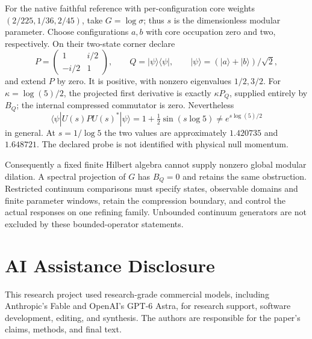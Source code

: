 \documentclass[11pt]{article}
\begin{document}
For the native faithful reference with per-configuration core weights
$(2/225,1/36,2/45)$, take $G=\log\sigma$; thus $s$ is the dimensionless
modular parameter. Choose configurations $a,b$ with core occupation zero
and two, respectively. On their two-state corner declare
\[
 P=\begin{pmatrix}1&i/2\\-i/2&1\end{pmatrix},\qquad
 Q=|\psi\rangle\langle\psi|,\qquad
 |\psi\rangle=(|a\rangle+|b\rangle)/\sqrt2,
\]
and extend $P$ by zero. It is positive, with nonzero eigenvalues
$1/2,3/2$. For $\kappa=\log(5)/2$, the projected first derivative
is exactly $\kappa P_Q$, supplied entirely by $B_Q$; the internal
compressed commutator is zero. Nevertheless
\[
 \langle\psi|U(s)PU(s)^*|\psi\rangle
 =1+\tfrac12\sin(s\log5)\ne e^{s\log(5)/2}
\]
in general. At $s=1/\log5$ the two values are approximately $1.420735$
and $1.648721$. The declared probe is not identified with physical null
momentum.

Consequently a fixed finite Hilbert algebra cannot supply nonzero
global modular dilation. A spectral projection of $G$ has $B_Q=0$ and
retains the same obstruction. Restricted continuum comparisons must
specify states, observable domains and finite parameter windows, retain
the compression boundary, and control the actual responses on one
refining family. Unbounded continuum generators are not excluded by
these bounded-operator statements.


\def\OPHPriorWorkBibitems{tex_fragments/PRIOR_WORK_RECOVERING_OBSERVER_SPACETIME_AND_EINSTEIN_DYNAMICS_FROM_OVERLAP_CONSISTENCY_BIBITEMS.tex}


\section*{AI Assistance Disclosure}
This research project used research-grade commercial models, including
Anthropic's Fable and OpenAI's GPT-6 Astra, for research support, software
development, editing, and synthesis. The authors are responsible for the
paper's claims, methods, and final text.
\end{document}
